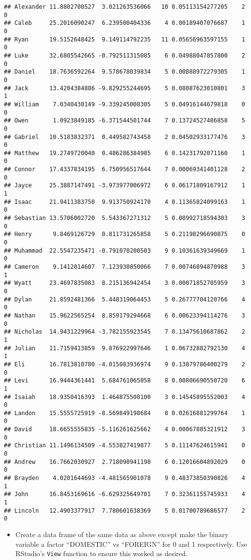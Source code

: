 \documentclass[
]{article}
\providecommand{\tightlist}{%
  \setlength{\itemsep}{0pt}\setlength{\parskip}{0pt}}
\begin{document}
\begin{verbatim}
## Alexander 11.8802700527  3.021263536066   10 0.05113154277205    2    0
## Caleb     25.2016090247  6.239500404336    4 0.00189407076687    1    0
## Ryan      19.5152648425  9.149114792235   11 0.05656963597155    1    0
## Luke      32.6805542665 -0.792511315085    6 0.04988047857800    2    0
## Daniel    18.7636592264  9.578678039834    5 0.00888972279305    1    0
## Jack      13.4204384886 -9.829255244695    5 0.08087623010801    3    1
## William    7.0340430149 -9.339245008305    5 0.04916144679818    0    0
## Owen       1.0923849185 -6.371544501744    7 0.13724527486858    5    0
## Gabriel   10.5183832371  0.449582743458    2 0.04502933177476    3    0
## Matthew   19.2749720040  0.486286384985    6 0.14231792071160    1    0
## Connor    17.4337834195  6.750956517644    7 0.00069341401128    2    0
## Jayce     25.3887147491 -3.973977006972    6 0.06171809167912    1    1
## Isaac     21.9411383750  9.913750924170    4 0.11365824099163    1    0
## Sebastian 13.5706002720  5.543367271312    5 0.08992718594303    3    0
## Henry      9.8469126729  0.811731265858    5 0.21198296690875    0    0
## Muhammad  22.5547235471 -0.791070200503    9 0.10361639349669    1    0
## Cameron    9.1412014607  7.123930850066    7 0.00746894870988    3    1
## Wyatt     23.4697835083  8.215136942454    3 0.00071852705959    3    0
## Dylan     21.8592481366  5.448319064453    5 0.26777704120766    4    0
## Nathan    15.9622565254  8.859179294668    6 0.00623394114276    3    0
## Nicholas  14.9431229964 -3.782155923545    7 0.13475610687862    2    1
## Julian    11.7159413859  9.876922997646    1 0.06732882792130    4    1
## Eli       16.7813810780 -4.015083936974    9 0.13879786400279    2    0
## Levi      16.9444361441  5.684761065058    8 0.00806690550720    6    1
## Isaiah    18.9350416393  1.464875508100    3 0.14545895552003    4    0
## Landon    15.5555725919 -8.569849198684    8 0.02616881299764    1    0
## David     18.6655555835 -5.116261625662    4 0.00067885321912    3    0
## Christian 11.1496134509 -4.553827419877    5 0.11147624615941    0    0
## Andrew    16.7662030927  2.718090941198    6 0.12016604892029    0    0
## Brayden    4.0201644693 -4.481565901078    9 0.48373850390826    4    1
## John      16.8453169616 -6.629325649701    7 0.32361155745933    4    1
## Lincoln   12.4903377917  7.780601638369    5 0.01700789686577    2    0
\end{verbatim}

\begin{itemize}
\tightlist
\item
  Create a data frame of the same data as above except make the binary
  variable a factor ``DOMESTIC'' vs ``FOREIGN'' for 0 and 1
  respectively. Use RStudio's \texttt{View} function to ensure this
  worked as desired.
\end{itemize}
\end{document}
